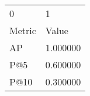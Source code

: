 \begin{tabular}{ll}
0 & 1 \\
Metric & Value \\
AP & 1.000000 \\
P@5 & 0.600000 \\
P@10 & 0.300000 \\
\end{tabular}
